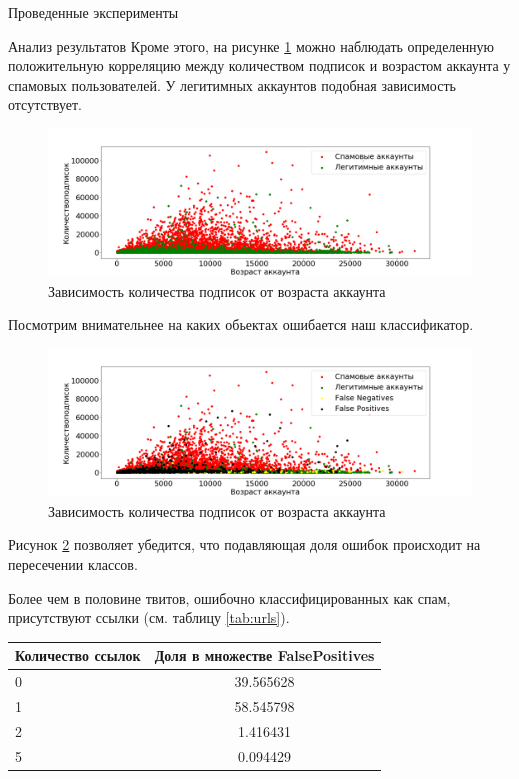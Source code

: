\begin{section}{Проведенные эксперименты}
\begin{subsection}{Анализ результатов}
Кроме этого, на рисунке \ref{pic:ageincrease} можно наблюдать определенную положительную корреляцию между количеством подписок и возрастом аккаунта у спамовых пользователей. У легитимных аккаунтов подобная зависимость отсутствует.

\begin{figure}[ht!]
\centering
\includegraphics[width=1.0\textwidth]{pics/ageincrease.png}
\caption{Зависимость количества подписок от возраста аккаунта}
\label{pic:ageincrease}
\end{figure}


Посмотрим внимательнее на каких обьектах ошибается наш классификатор.

\begin{figure}[ht!]
\centering
\includegraphics[width=1.0\textwidth]{pics/ageincreasewitherrors.png}
\caption{Зависимость количества подписок от возраста аккаунта}
\label{pic:ageincreasewithwerrors}
\end{figure}

Рисунок \ref{pic:ageincreasewithwerrors} позволяет убедится, что подавляющая доля ошибок происходит на пересечении классов.

Более чем в половине твитов, ошибочно классифицированных как спам, присутствуют ссылки (см. таблицу \ref{tab:urls}).



\begin{table}[H]
\centering
{\begin{tabular}{|l|c|}
\hline
\textbf{Количество ссылок} & \textbf{Доля в множестве FalsePositives} \\
\hline
0 &   39.565628 \\
\hline
1  &  58.545798 \\
\hline
2  &   1.416431 \\
\hline
5  &  0.094429 \\
\hline
\end{tabular}}


\end{table}
\end{subsection}
\end{section}
